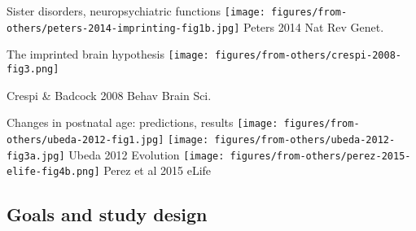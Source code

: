 \documentclass{beamer}
\begin{document}
\begin{frame}[t]{Sister disorders, neuropsychiatric functions}
\texttt{[image: figures/from-others/peters-2014-imprinting-fig1b.jpg]}
{\tiny Peters 2014 Nat Rev Genet.}

\end{frame}

\begin{frame}{The imprinted brain hypothesis}
\texttt{[image: figures/from-others/crespi-2008-fig3.png]}
\vfill
{\tiny \raggedright{Crespi \& Badcock 2008 Behav Brain Sci.}}
\end{frame}

\begin{frame}{Changes in postnatal age: predictions, results}
\texttt{[image: figures/from-others/ubeda-2012-fig1.jpg]}
\hfill
\texttt{[image: figures/from-others/ubeda-2012-fig3a.jpg]}
{\tiny Ubeda 2012 Evolution}
\vfill
\texttt{[image: figures/from-others/perez-2015-elife-fig4b.png]}
{\tiny Perez et al 2015 eLife}
\end{frame}

\subsection{Goals and study design}
\end{document}
